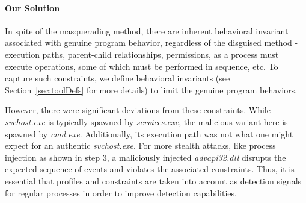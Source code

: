 \paragraph{Our Solution}
\label{sec:intuition}

In spite of the masquerading method, there are inherent behavioral invariant associated with genuine program behavior, regardless of the disguised method - execution paths, parent-child relationships, permissions, as a process must execute operations, some of which must be performed in sequence, etc.
To capture such constraints, we define behavioral invariants (see Section~\ref{sec:toolDefs} for more details) to limit the genuine program behaviors.


However, there were significant deviations from these constraints. 
While \textit{svchost.exe} is typically spawned by \textit{services.exe}, the malicious variant here is spawned by \textit{cmd.exe}. Additionally, its execution path was not what one might expect for an authentic \textit{svchost.exe}.
For more stealth attacks, like process injection as shown in step 3, a maliciously injected \textit{advapi32.dll} disrupts the expected sequence of events and violates the associated constraints. Thus, it is essential that profiles and constraints are taken into account as detection signals for regular processes in order to improve detection capabilities.




